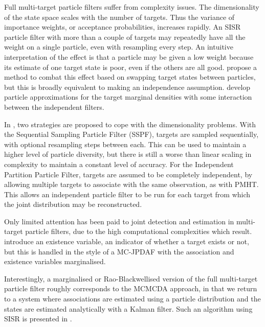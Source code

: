 Full multi-target particle filters suffer from complexity issues. The dimensionality of the state space scales with the number of targets. Thus the variance of importance weights, or acceptance probabilities, increases rapidly. An SISR particle filter with more than a couple of targets may repeatedly have all the weight on a single particle, even with resampling every step. An intuitive interpretation of the effect is that a particle may be given a low weight because its estimate of one target state is poor, even if the others are all good. \cite{Orton2002} propose a method to combat this effect based on swapping target states between particles, but this is broadly equivalent to making an independence assumption. \cite{Maskell2003} develop particle approximations for the target marginal densities with some interaction between the independent filters.

In \cite{Vermaak2005}, two strategies are proposed to cope with the dimensionality problems. With the Sequential Sampling Particle Filter (SSPF), targets are sampled sequentially, with optional resampling steps between each. This can be used to maintain a higher level of particle diversity, but there is still a worse than linear scaling in complexity to maintain a constant level of accuracy. For the Independent Partition Particle Filter, targets are assumed to be completely independent, by allowing multiple targets to associate with the same observation, as with PMHT. This allows an independent particle filter to be run for each target from which the joint distribution may be reconstructed.

Only limited attention has been paid to joint detection and estimation in multi-target particle filters, due to the high computational complexities which result. \cite{Vermaak2005,Horridge2009} introduce an existence variable, an indicator of whether a target exists or not, but this is handled in the style of a MC-JPDAF with the association and existence variables marginalised.

Interestingly, a marginalised or Rao-Blackwellised version of the full multi-target particle filter roughly corresponds to the MCMCDA approach, in that we return to a system where associations are estimated using a particle distribution and the states are estimated analytically with a Kalman filter. Such an algorithm using SISR is presented in \cite{Sarkka2007}.




